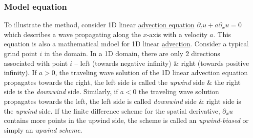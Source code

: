 \documentclass{article}
\begin{document}
\subsubsection{Model equation}
To illustrate the method, consider 1D linear \href{https://en.wikipedia.org/wiki/Advection_equation}{advection equation} $\partial_tu + a\partial_xu = 0$ which describes a wave propagating along the $x$-axis with a velocity $a$. This equation is also a mathematical mdoel for 1D linear \href{https://en.wikipedia.org/wiki/Advection}{advection}. Consider a typical grind point $i$ in the domain. In a 1D domain, there are only 2 directions associated with point $i$ -- left (towards negative infinity) \& right (towards positive infinity). If $a > 0$, the traveling wave solution of the 1D linear advection equation propagates towards the right, the left side is called the {\it upwind} side \& the right side is the {\it downwind} side. Similarly, if $a < 0$ the traveling wave solution propagates towards the left, the left side is called {\it downwind} side \& right side is the {\it upwind} side. If the finite difference scheme for the spatial derivative, $\partial_xu$ contains more points in the upwind side, the scheme is called an {\it upwind-biased} or simply an {\it upwind scheme}.
\end{document}
